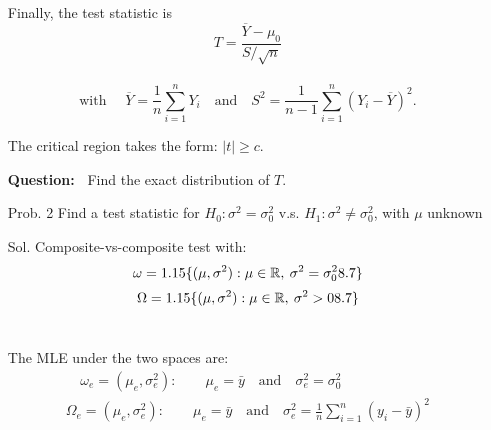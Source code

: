 \begin{frame}

	\begin{enumerate}
		\item[]Finally, the test statistic is \\[2em]
			\[
				\boxed{T =  \frac{\overline{Y}-\mu_0}{S/\sqrt{n}} }
			\]
			\\[2em]
			\[
				\text{with }\quad
				\overline{Y}= \frac 1n \sum_{i=1}^n Y_i
				\quad\text{and}\quad
				S^2 =  \frac{1}{n-1} \sum_{i=1}^n \left(Y_i-\overline{Y} \right)^2.
			\]
		\item[] The critical region takes the form: $|t|\ge c$.
		\vfill
		\item[] {\bf Question:~} Find the exact distribution of $T$.
	\end{enumerate}
\end{frame}
\begin{frame}
	\begin{enumerate}
	\item[Prob. 2] Find a test statistic for $H_0 : \sigma^2 = \sigma^2_0$ v.s. $H_1 : \sigma^2 \ne \sigma^2_0$, with $\mu$ unknown\\[2em]
		\vfill
	\item[Sol.] Composite-vs-composite test with:\\[1em]
\[\omega =1.15\{(\mu,\sigma^2): \mu\in\mathbb{R}, \: \sigma^2=\sigma_0^28.7\}\]
\[\Omega =1.15\{(\mu,\sigma^2): \mu\in\mathbb{R}, \: \sigma^2>08.7\}\]\\[2em]
\item[] The MLE under the two spaces are:\\[1em]
	\begin{align}\tag{Under $\omega$}
		\omega_e=(\mu_e,\sigma_e^2): \qquad
		\mu_e =\bar{y}	\quad\text{and}\quad \sigma_e^2 =\sigma_0^2\phantom{aaaaaaaaaa}
	\end{align}
	\begin{align}\tag{Under $\Omega$}
		\Omega_e=(\mu_e,\sigma_e^2): \qquad
		\mu_e =\bar{y}	\quad\text{and}\quad \sigma_e^2 = \frac 1n \sum_{i=1}^n (y_i-\bar{y})^2
	\end{align}
	\end{enumerate}
\end{frame}

